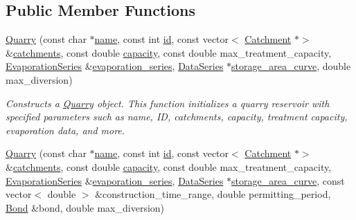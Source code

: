 \subsection*{Public Member Functions}
\begin{DoxyCompactItemize}
\item 
\mbox{\hyperlink{classQuarry_a126fddda9e5deeb667a6a9dbb0533470}{Quarry}} (const char $\ast$\mbox{\hyperlink{classWaterSource_a846ea74c5b453d014f594d41fee8c765}{name}}, const int \mbox{\hyperlink{classWaterSource_a6eafe5dfefd317877d1244e8a7c6e742}{id}}, const vector$<$ \mbox{\hyperlink{classCatchment}{Catchment}} $\ast$$>$ \&\mbox{\hyperlink{classWaterSource_a8c18c34f23f8a06685c1d12f462ed830}{catchments}}, const double \mbox{\hyperlink{classWaterSource_a2ec257b415b248214a8bce7fc5267723}{capacity}}, const double max\+\_\+treatment\+\_\+capacity, \mbox{\hyperlink{classEvaporationSeries}{Evaporation\+Series}} \&\mbox{\hyperlink{classReservoir_a2d2d9b302c13703309bb798d24136810}{evaporation\+\_\+series}}, \mbox{\hyperlink{classDataSeries}{Data\+Series}} $\ast$\mbox{\hyperlink{classReservoir_a46bd5b750963dfa9a57b247fd77ab8ff}{storage\+\_\+area\+\_\+curve}}, double max\+\_\+diversion)
\begin{DoxyCompactList}\small\item\em Constructs a \mbox{\hyperlink{classQuarry}{Quarry}} object. This function initializes a quarry reservoir with specified parameters such as name, ID, catchments, capacity, treatment capacity, evaporation data, and more. \end{DoxyCompactList}\item 
\mbox{\hyperlink{classQuarry_a13cc1caeda6846900893f8d24c49b111}{Quarry}} (const char $\ast$\mbox{\hyperlink{classWaterSource_a846ea74c5b453d014f594d41fee8c765}{name}}, const int \mbox{\hyperlink{classWaterSource_a6eafe5dfefd317877d1244e8a7c6e742}{id}}, const vector$<$ \mbox{\hyperlink{classCatchment}{Catchment}} $\ast$$>$ \&\mbox{\hyperlink{classWaterSource_a8c18c34f23f8a06685c1d12f462ed830}{catchments}}, const double \mbox{\hyperlink{classWaterSource_a2ec257b415b248214a8bce7fc5267723}{capacity}}, const double max\+\_\+treatment\+\_\+capacity, \mbox{\hyperlink{classEvaporationSeries}{Evaporation\+Series}} \&\mbox{\hyperlink{classReservoir_a2d2d9b302c13703309bb798d24136810}{evaporation\+\_\+series}}, \mbox{\hyperlink{classDataSeries}{Data\+Series}} $\ast$\mbox{\hyperlink{classReservoir_a46bd5b750963dfa9a57b247fd77ab8ff}{storage\+\_\+area\+\_\+curve}}, const vector$<$ double $>$ \&construction\+\_\+time\+\_\+range, double permitting\+\_\+period, \mbox{\hyperlink{classBond}{Bond}} \&bond, double max\+\_\+diversion)

\end{DoxyCompactItemize}
